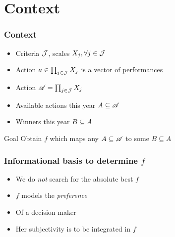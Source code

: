 \documentclass[french,english]{beamer}
\begin{document}
\section{Context}
\begin{frame}
	\frametitle{Context}
	\begin{itemize}
		\item Criteria $\mathcal{J}$, scales $X_j, \forall j \in \mathcal{J}$
		\item Action $a \in \prod_{j \in \mathcal{J}} X_j$ is a vector of performances
		\item Action $\mathscr{A} = \prod_{j \in \mathcal{J}} X_j$
		\item Available actions this year $A \subseteq \mathscr{A}$
		\item Winners this year $B \subseteq A$
	\end{itemize}
	\begin{block}{Goal}
		Obtain $f$ which maps any $A \subseteq \mathscr{A}$ to some $B \subseteq A$
	\end{block}
	\begin{center}
	\end{center}
\end{frame}

\begin{frame}
	\frametitle{Informational basis to determine $f$}
	\begin{itemize}
		\item We do \emph{not} search for the absolute best $f$
		\item $f$ models the \emph{preference}
		\item Of a decision maker
		\item Her subjectivity is to be integrated in $f$
	\end{itemize}
\end{frame}
\end{document}
